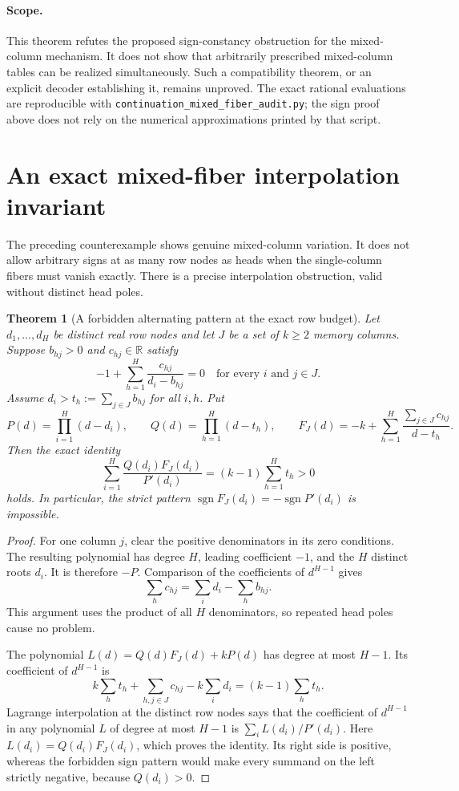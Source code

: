 \documentclass[11pt]{article}
\newtheorem{theorem}{Theorem}
\begin{document}
\paragraph{Scope.}
This theorem refutes the proposed sign-constancy obstruction for the
mixed-column mechanism. It does not show that arbitrarily prescribed
mixed-column tables can be realized simultaneously. Such a compatibility
theorem, or an explicit decoder establishing it, remains unproved.
The exact rational evaluations are reproducible with
\texttt{continuation\_mixed\_fiber\_audit.py}; the sign proof above
does not rely on the numerical approximations printed by that script.

\section{An exact mixed-fiber interpolation invariant}

The preceding counterexample shows genuine mixed-column variation.
It does not allow arbitrary signs at as many row nodes as heads when
the single-column fibers must vanish exactly. There is a precise
interpolation obstruction, valid without distinct head poles.

\begin{theorem}[A forbidden alternating pattern at the exact row budget]
Let $d_1,\ldots,d_H$ be distinct real row nodes and let $J$ be a set
of $k\ge2$ memory columns. Suppose $b_{hj}>0$ and $c_{hj}\in\mathbb R$
satisfy
\[
 -1+\sum_{h=1}^H\frac{c_{hj}}{d_i-b_{hj}}=0
 \quad\text{for every $i$ and $j\in J$}.
\]
Assume $d_i>t_h:=\sum_{j\in J}b_{hj}$ for all $i,h$. Put
\[
 P(d)=\prod_{i=1}^H(d-d_i),\qquad
 Q(d)=\prod_{h=1}^H(d-t_h),\qquad
 F_J(d)=-k+\sum_{h=1}^H
            \frac{\sum_{j\in J}c_{hj}}{d-t_h}.
\]
Then the exact identity
\[
 \sum_{i=1}^H\frac{Q(d_i)F_J(d_i)}{P'(d_i)}
       =(k-1)\sum_{h=1}^H t_h>0
\]
holds. In particular, the strict pattern
$\operatorname{sgn}F_J(d_i)=-\operatorname{sgn}P'(d_i)$ is impossible.
\end{theorem}

\begin{proof}
For one column $j$, clear the positive denominators in its zero
conditions. The resulting polynomial has degree $H$, leading
coefficient $-1$, and the $H$ distinct roots $d_i$. It is therefore
$-P$. Comparison of the coefficients of $d^{H-1}$ gives
\[
 \sum_h c_{hj}=\sum_i d_i-\sum_h b_{hj}.
\]
This argument uses the product of all $H$ denominators, so repeated
head poles cause no problem.

The polynomial $L(d)=Q(d)F_J(d)+kP(d)$ has degree at most $H-1$.
Its coefficient of $d^{H-1}$ is
\[
 k\sum_h t_h+\sum_{h,j\in J}c_{hj}-k\sum_i d_i
      =(k-1)\sum_h t_h.
\]
Lagrange interpolation at the distinct row nodes says that the
coefficient of $d^{H-1}$ in any polynomial $L$ of degree at most
$H-1$ is $\sum_i L(d_i)/P'(d_i)$. Here $L(d_i)=Q(d_i)F_J(d_i)$,
which proves the identity. Its right side is positive, whereas the
forbidden sign pattern would make every summand on the left strictly
negative, because $Q(d_i)>0$.
\end{proof}
\end{document}

